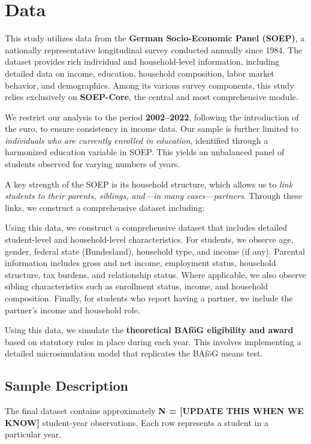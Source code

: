 \section{Data}
This study utilizes data from the \textbf{German Socio-Economic Panel (SOEP)}, a nationally representative longitudinal survey conducted annually since 1984. The dataset provides rich individual and household-level information, including detailed data on income, education, household composition, labor market behavior, and demographics. Among its various survey components, this study relies exclusively on \textbf{SOEP-Core}, the central and most comprehensive module.

We restrict our analysis to the period \textbf{2002–2022}, following the introduction of the euro, to ensure consistency in income data. Our sample is further limited to \textit{individuals who are currently enrolled in education}, identified through a harmonized education variable in SOEP. This yields an unbalanced panel of students observed for varying numbers of years.

A key strength of the SOEP is its household structure, which allows us to \textit{link students to their parents, siblings, and—in many cases—partners}. Through these links, we construct a comprehensive dataset including:

Using this data, we construct a comprehensive dataset that includes detailed student-level and household-level characteristics. For students, we observe age, gender, federal state (Bundesland), household type, and income (if any). Parental information includes gross and net income, employment status, household structure, tax burdens, and relationship status. Where applicable, we also observe sibling characteristics such as enrollment status, income, and household composition. Finally, for students who report having a partner, we include the partner’s income and household role.

Using this data, we simulate the \textbf{theoretical BAföG eligibility and award} based on statutory rules in place during each year. This involves implementing a detailed microsimulation model that replicates the BAföG means test.

\subsection{Sample Description}
The final dataset contains approximately \textbf{N = [UPDATE THIS WHEN WE KNOW]} student-year observations. Each row represents a student in a particular year.

